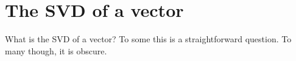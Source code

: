 \section{The SVD of a vector}
What is the SVD of a vector? To some this is a straightforward question. To many though, it is obscure.

\endinput